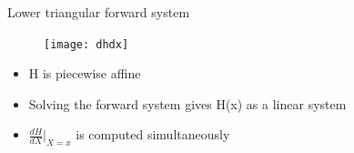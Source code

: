 \documentclass[xcolor=svgnames, english, smaller]{beamer}
\theoremstyle{plain}
\theoremstyle{definition}
\theoremstyle{plain}
\theoremstyle{plain}
\newcommand \FontSmall{\fontsize{6}{6}\selectfont}
\begin{document}
\begin{frame}{Lower triangular forward system}


\FontSmall

\begin{minipage}[t]{0.40\linewidth}
\begin{figure}[h]
\texttt{[image: dhdx]}
\end{figure}

\begin{itemize}
\item H is piecewise affine
\item Solving the forward system gives H(x) as a linear system
\item $\frac{dH}{dX}\bigg|_{X=x}$ is computed simultaneously
\end{itemize}



\end{minipage}
\end{frame}
\end{document}
